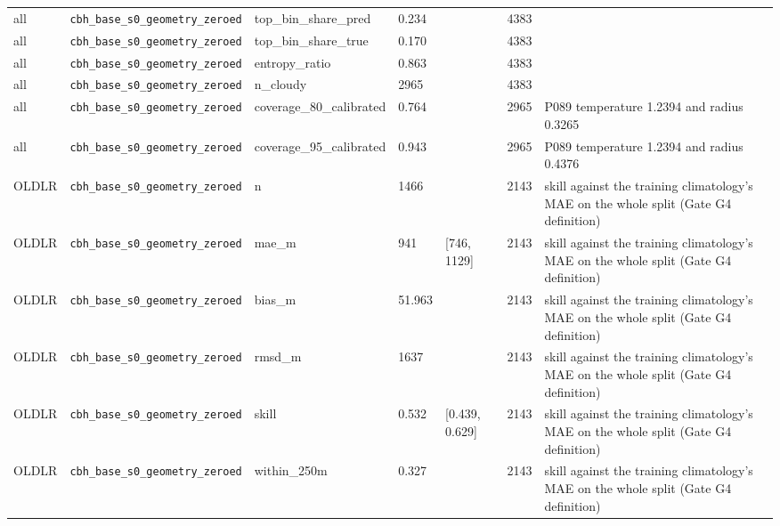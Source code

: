 \begin{center}
{\begin{tabular}{lp{2.4cm}llllp{7.3cm}}
all & \texttt{cbh\_\allowbreak{}base\_\allowbreak{}s0\_\allowbreak{}geometry\_\allowbreak{}zeroed} & top\_bin\_share\_pred & 0.234 &  & 4383 &  \\
all & \texttt{cbh\_\allowbreak{}base\_\allowbreak{}s0\_\allowbreak{}geometry\_\allowbreak{}zeroed} & top\_bin\_share\_true & 0.170 &  & 4383 &  \\
all & \texttt{cbh\_\allowbreak{}base\_\allowbreak{}s0\_\allowbreak{}geometry\_\allowbreak{}zeroed} & entropy\_ratio & 0.863 &  & 4383 &  \\
all & \texttt{cbh\_\allowbreak{}base\_\allowbreak{}s0\_\allowbreak{}geometry\_\allowbreak{}zeroed} & n\_cloudy & 2965 &  & 4383 &  \\
all & \texttt{cbh\_\allowbreak{}base\_\allowbreak{}s0\_\allowbreak{}geometry\_\allowbreak{}zeroed} & coverage\_80\_calibrated & 0.764 &  & 2965 & P089 temperature 1.2394 and radius 0.3265 \\
all & \texttt{cbh\_\allowbreak{}base\_\allowbreak{}s0\_\allowbreak{}geometry\_\allowbreak{}zeroed} & coverage\_95\_calibrated & 0.943 &  & 2965 & P089 temperature 1.2394 and radius 0.4376 \\
OLDLR & \texttt{cbh\_\allowbreak{}base\_\allowbreak{}s0\_\allowbreak{}geometry\_\allowbreak{}zeroed} & n & 1466 &  & 2143 & skill against the training climatology's MAE on the whole split (Gate G4 definition) \\
OLDLR & \texttt{cbh\_\allowbreak{}base\_\allowbreak{}s0\_\allowbreak{}geometry\_\allowbreak{}zeroed} & mae\_m & 941 & [746, 1129] & 2143 & skill against the training climatology's MAE on the whole split (Gate G4 definition) \\
OLDLR & \texttt{cbh\_\allowbreak{}base\_\allowbreak{}s0\_\allowbreak{}geometry\_\allowbreak{}zeroed} & bias\_m & 51.963 &  & 2143 & skill against the training climatology's MAE on the whole split (Gate G4 definition) \\
OLDLR & \texttt{cbh\_\allowbreak{}base\_\allowbreak{}s0\_\allowbreak{}geometry\_\allowbreak{}zeroed} & rmsd\_m & 1637 &  & 2143 & skill against the training climatology's MAE on the whole split (Gate G4 definition) \\
OLDLR & \texttt{cbh\_\allowbreak{}base\_\allowbreak{}s0\_\allowbreak{}geometry\_\allowbreak{}zeroed} & skill & 0.532 & [0.439, 0.629] & 2143 & skill against the training climatology's MAE on the whole split (Gate G4 definition) \\
OLDLR & \texttt{cbh\_\allowbreak{}base\_\allowbreak{}s0\_\allowbreak{}geometry\_\allowbreak{}zeroed} & within\_250m & 0.327 &  & 2143 & skill against the training climatology's MAE on the whole split (Gate G4 definition) \\

\end{tabular}}
\end{center}

